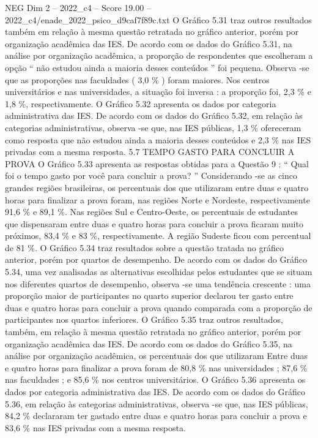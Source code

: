 \begin{textsample}{NEG Dim 2 – 2022\_c4 – Score 19.00 – 2022\_c4/enade\_2022\_psico\_d9caf7f89c.txt}
O Gráfico 5.31 traz outros resultados também em relação à mesma questão retratada no gráfico anterior, porém por organização acadêmica das IES.
De acordo com os dados do Gráfico 5.31, na análise por organização acadêmica, a proporção de respondentes que escolheram a opção “ não estudou ainda a maioria desses conteúdos ” foi pequena.
Observa -se que as proporções nas faculdades ( 3,0 \% ) foram maiores.
Nos centros universitários e nas universidades, a situação foi inversa : a proporção foi, 2,3 \% e 1,8 \%, respectivamente.
O Gráfico 5.32 apresenta os dados por categoria administrativa das IES.
De acordo com os dados do Gráfico 5.32, em relação às categorias administrativas, observa -se que, nas IES públicas, 1,3 \% ofereceram como resposta que não estudou ainda a maioria desses conteúdos e 2,3 \% nas IES privadas com a mesma resposta. 5.7 TEMPO GASTO PARA CONCLUIR A PROVA O Gráfico 5.33 apresenta as respostas obtidas para a Questão 9 : “ Qual foi o tempo gasto por você para concluir a prova? ” Considerando -se as cinco grandes regiões brasileiras, os percentuais dos que utilizaram entre duas e quatro horas para finalizar a prova foram, nas regiões Norte e Nordeste, respectivamente 91,6 \% e 89,1 \%.
Nas regiões Sul e Centro-Oeste, os percentuais de estudantes que dispensaram entre duas e quatro horas para concluir a prova ficaram muito próximos, 83,4 \% e 83 \%, respectivamente.
A região Sudeste ficou com percentual de 81 \%.
O Gráfico 5.34 traz resultados sobre a questão tratada no gráfico anterior, porém por quartos de desempenho.
De acordo com os dados do Gráfico 5.34, uma vez analisadas as alternativas escolhidas pelos estudantes que se situam nos diferentes quartos de desempenho, observa -se uma tendência crescente : uma proporção maior de participantes no quarto superior declarou ter gasto entre duas e quatro horas para concluir a prova quando comparada com a proporção de participantes nos quartos inferiores.
O Gráfico 5.35 traz outros resultados, também, em relação à mesma questão retratada no gráfico anterior, porém por organização acadêmica das IES.
De acordo com os dados do Gráfico 5.35, na análise por organização acadêmica, os percentuais dos que utilizaram Entre duas e quatro horas para finalizar a prova foram de 80,8 \% nas universidades ; 87,6 \% nas faculdades ; e 85,6 \% nos centros universitários.
O Gráfico 5.36 apresenta os dados por categoria administrativa das IES.
De acordo com os dados do Gráfico 5.36, em relação às categorias administrativas, observa -se que, nas IES públicas, 84,2 \% declararam ter gastado entre duas e quatro horas para concluir a prova e 83,6 \% nas IES privadas com a mesma resposta.

\end{textsample}

